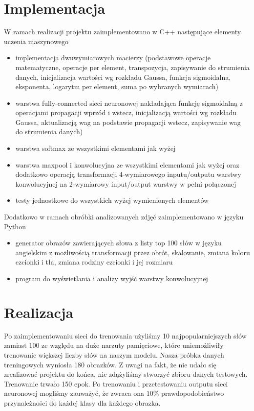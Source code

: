 \documentclass{article}
\begin{document}
\section{Implementacja}
W ramach realizacji projektu zaimplementowano w C++ następujące elementy uczenia maszynowego
\begin{itemize}
    \item implementacja dwuwymiarowych macierzy (podstawowe operacje matematyczne, operacje per element, transpozycja, zapisywanie do strumienia danych, inicjalizacja wartości wg rozkładu Gaussa, funkcja sigmoidalna, eksponenta, logarytm per element, suma po wybranych wymiarach)
    \item warstwa fully-connected sieci neuronowej nakładająca funkcję sigmoidalną z operacjami propagacji wprzód i wstecz, inicjalizacją wartości wg rozkładu Gaussa, aktualizacją wag na podstawie propagacji wstecz, zapisywanie wag do strumienia danych)
    \item warstwa softmax ze wszystkimi elementami jak wyżej
    \item warstwa maxpool i konwolucyjna ze wszystkimi elementami jak wyżej oraz dodatkowo operacją transformacji 4-wymiarowego inputu/outputu warstwy konwolucyjnej na 2-wymiarowy input/output warstwy w pełni połączonej
    \item testy jednostkowe do wszystkich wyżej wymienionych elementów
\end{itemize}
Dodatkowo w ramach obróbki analizowanych zdjęć zaimplementowano w języku Python
\begin{itemize}
    \item generator obrazów zawierających słowa z listy top 100 słów w języku angielskim z możliwością transformacji przez obrót, skalowanie, zmiana koloru czcionki i tła, zmiana rodziny czcionki i jej rozmiaru
    \item program do wyświetlania i analizy wyjść warstwy konwolucyjnej
\end{itemize}
\section{Realizacja}
Po zaimplementowaniu sieci do trenowania użyliśmy 10 najpopularniejszych słów zamiast 100 ze względu na duże narzuty pamięciowe, które uniemożliwiły trenowanie większej liczby słów na naszym modelu. Nasza próbka danych treningowych wyniosła 180 obrazków. Z uwagi na fakt, że nie udało się zrealizować projektu do końca, nie zdążyliśmy stworzyć zbioru danych testowych. Trenowanie trwało 150 epok. Po trenowaniu i przetestowaniu outputu sieci neuronowej mogliśmy zauważyć, że zwraca ona $10\%$ prawdopodobieństwo przynależności do każdej klasy dla każdego obrazka.
\end{document}
